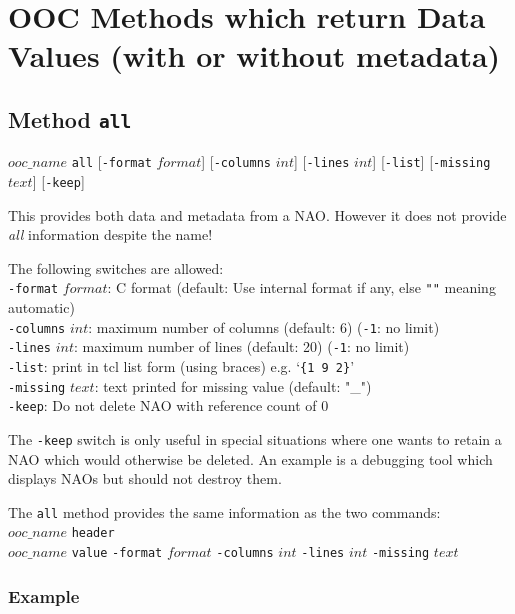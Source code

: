 
\section{OOC Methods which return Data Values (with or without metadata)}
    \label{ooc-data}

\subsection{Method \texttt{all}}
    \label{ooc-data-all}

  $ooc\_name$ 
  \texttt{all} 
  [\texttt{-format} $format$]
  [\texttt{-columns} $int$]
  [\texttt{-lines} $int$]
  [\texttt{-list}]
  [\texttt{-missing} $text$]
  [\texttt{-keep}]

This provides both data and metadata from a NAO. However it does
  not provide 
  \emph{all} information despite the name!

The following switches are allowed:
  \\
  \texttt{-format} 
  $format$: C format (default: Use internal format if any,
  else \texttt{""} meaning automatic)
  \\
  \texttt{-columns} 
  $int$: maximum number of columns (default: 6) (\texttt{-1}: no limit)
  \\
  \texttt{-lines} 
  $int$: maximum number of lines (default: 20) (\texttt{-1}: no limit)
  \\
  \texttt{-list}: print in tcl list form (using braces) e.g. `\texttt{\{1 9 2\}}'
  \\
  \texttt{-missing} 
  $text$: text printed for missing value (default:
  "\_")
  \\
  \texttt{-keep}: Do not delete NAO with reference count of 0

The \texttt{-keep} switch is only useful in special situations where one wants to retain a
NAO which would otherwise be deleted.
An example is a debugging tool which displays NAOs but should not destroy them.

The \texttt{all} method provides the same information as the two commands:
  \\
  $ooc\_name$ 
  \texttt{header}
  \\
  $ooc\_name$ 
  \texttt{value} 
  \texttt{-format} $format$ 
  \texttt{-columns} $int$ 
  \texttt{-lines} $int$ 
  \texttt{-missing} 
  $text$

\subsubsection{Example}

